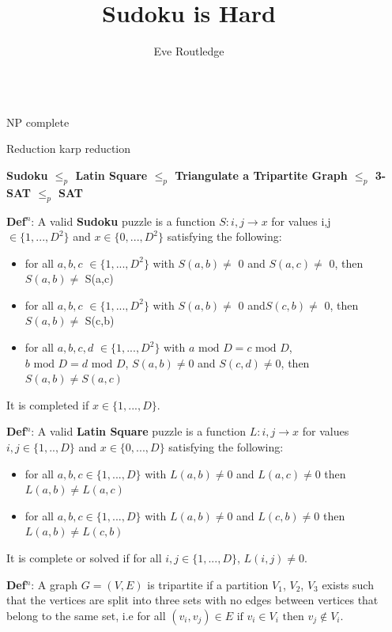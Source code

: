 \documentclass[final]{beamer}
\title{Sudoku is Hard}
\author{Eve Routledge}
\institute[shortinst]{Durham University}
\newlength{\sepwidth}
\newlength{\colwidth}
\newcounter{row}
\newcounter{col}
\newcommand{\separatorcolumn}{\begin{column}{\sepwidth}\end{column}}
\begin{document}
\begin{frame}[t]
\begin{columns}[t]
\separatorcolumn

\begin{column}{\colwidth}

  \begin{block}{NP complete}


  \end{block}
  \begin{block}{Reduction}
karp reduction

   \textbf{Sudoku $\leq_p$ Latin Square $\leq_p$ Triangulate a Tripartite Graph $\leq_p$ 3-SAT $\leq_p$ SAT}

	\textbf{Def$^n$}: A valid \textbf{Sudoku} puzzle is a function $ S: i,j \rightarrow x$ for values i,j $\in \{1,...,D^2\}$ and $x \in \{0,...,D^2\}$ satisfying the following:
\begin{itemize}
	\item{for all $a,b,c$  $\in \{1,...,D^2\}$ with $S(a,b)\neq$ 0 and $S(a,c)\neq$ 0, then $ S(a,b)\neq$ S(a,c) }
	\item{for all $a,b,c$  $\in \{1,...,D^2\}$ with $S(a,b)\neq$ 0 and$ S(c,b)\neq$ 0, then $S(a,b)\neq$ S(c,b) }
	\item{for all $ a,b,c,d $ $\in \{1,...,D^2\}$ with $a\text{ mod }D = c\text{ mod }D$, $b\text{ mod }D  =  d\text{ mod }D$, $S(a,b)\neq 0$  and $S(c,d) \neq 0$, then $S(a,b)\neq S(a,c)$ }
\end{itemize}
It is completed if $x \in \{1,...,D\}$.


\textbf{Def$^n$}: A valid \textbf{Latin Square} puzzle is a function $L:i,j \rightarrow x$ for values $i,j \in \{1,..,D\} $ and $x \in \{0,...,D\}$ satisfying the following:
\begin{itemize}
\item{for all $a,b,c \in \{1,...,D\}$ with $L(a,b) \neq 0 $ and $L(a,c) \neq 0$ then $L(a,b) \neq L(a,c)$}
\item{for all $a,b,c \in \{1,...,D\}$ with $L(a,b) \neq 0 $ and $L(c,b) \neq 0$ then $L(a,b) \neq L(c,b)$}
\end{itemize}
It is complete or solved if for all $i,j \in \{1,...,D\}$, $L(i,j) \neq 0$.

\textbf{Def$^n$}: A graph $G=(V,E)$ is tripartite if a partition $V_1$, $V_2$, $V_3$ exists such that the vertices are split into three sets with no edges between vertices that belong to the same set, i.e for all $(v_i,v_j) \in E\text{ if } v_i \in V_i\text{ then }v_j \not\in V_i $.


\end{block}
\end{column}
\end{columns}
\end{frame}
\end{document}
